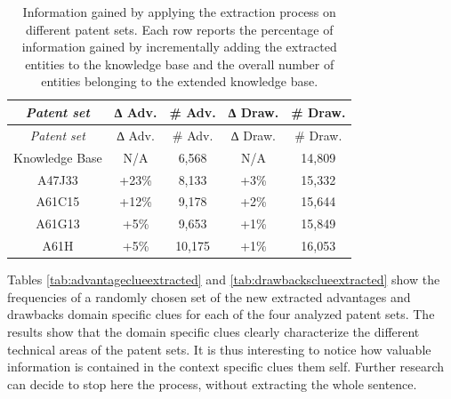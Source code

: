 \documentclass[]{book}
\theoremstyle{definition}
\theoremstyle{definition}
\theoremstyle{definition}
\theoremstyle{remark}
\begin{document}
\begin{longtable}[]{@{}ccccc@{}}
\caption{\label{tab:infogain1} Information gained by applying the extraction
process on different patent sets. Each row reports the percentage of
information gained by incrementally adding the extracted entities to the
knowledge base and the overall number of entities belonging to the
extended knowledge base.}\tabularnewline
\toprule
\emph{Patent set} & ∆ Adv. & \# Adv. & ∆ Draw. & \# Draw.\tabularnewline
\midrule
\endfirsthead
\toprule
\emph{Patent set} & ∆ Adv. & \# Adv. & ∆ Draw. & \# Draw.\tabularnewline
\midrule
\endhead
Knowledge Base & N/A & 6,568 & N/A & 14,809\tabularnewline
A47J33 & +23\% & 8,133 & +3\% & 15,332\tabularnewline
A61C15 & +12\% & 9,178 & +2\% & 15,644\tabularnewline
A61G13 & +5\% & 9,653 & +1\% & 15,849\tabularnewline
A61H & +5\% & 10,175 & +1\% & 16,053\tabularnewline
\bottomrule
\end{longtable}

Tables \ref{tab:advantageclueextracted} and
\ref{tab:drawbacksclueextracted} show the frequencies of a randomly
chosen set of the new extracted advantages and drawbacks domain specific
clues for each of the four analyzed patent sets. The results show that
the domain specific clues clearly characterize the different technical
areas of the patent sets. It is thus interesting to notice how valuable
information is contained in the context specific clues them self.
Further research can decide to stop here the process, without extracting
the whole sentence.
\end{document}
